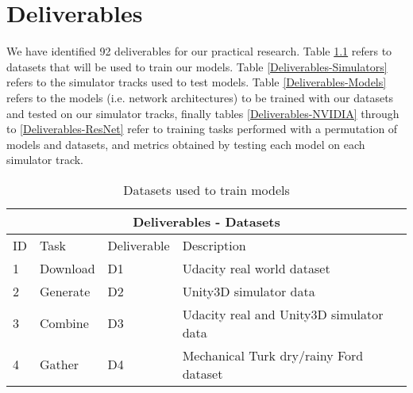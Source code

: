 \chapter{Deliverables} %

\label{AppendixC-deliverables} %

We have identified 92 deliverables for our practical research. Table \ref{Deliverables-Datasets} refers to datasets that will be used to train our models. Table \ref{Deliverables-Simulators} refers to the simulator tracks used to test models. Table \ref{Deliverables-Models} refers to the models (i.e. network architectures) to be trained with our datasets and tested on our simulator tracks, finally tables \ref{Deliverables-NVIDIA} through to \ref{Deliverables-ResNet} refer to training tasks performed with a permutation of models and datasets, and metrics obtained by testing each model on each simulator track.


\begin{table}[]
\begin{center}
\begin{tabular}{|l|l|l|l|}
\hline
\multicolumn{4}{|c|}{Deliverables - Datasets} \\ \hline


ID & Task &  Deliverable & Description \\ \hline\hline
1 & Download & D1 &  Udacity real world dataset  \\ \hline
2 & Generate & D2 &  Unity3D simulator data  \\ \hline
3 & Combine & D3 &  Udacity real and Unity3D simulator data  \\ \hline
4 & Gather & D4 &  Mechanical Turk dry/rainy Ford dataset  \\ \hline

\end{tabular}
\end{center}
\caption{Datasets used to train models}
\label{Deliverables-Datasets}
\end{table}


